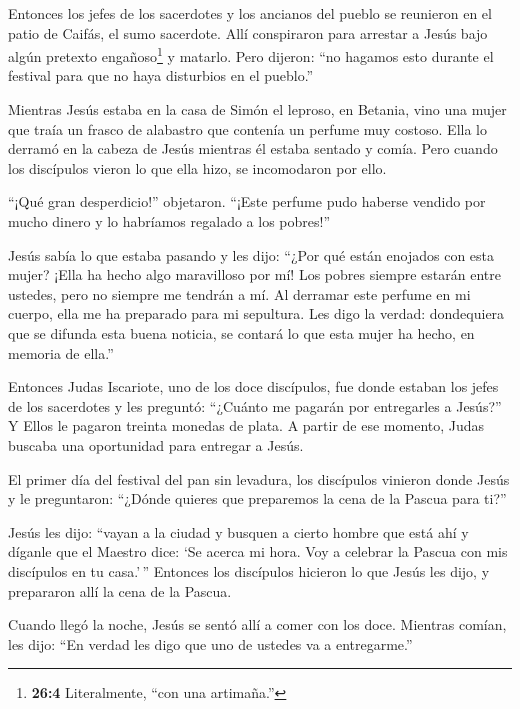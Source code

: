  Entonces los jefes de los sacerdotes y los ancianos del
pueblo se reunieron en el patio de Caifás, el sumo sacerdote.
 Allí conspiraron para arrestar a Jesús bajo algún pretexto
engañoso\footnote{\textbf{26:4} Literalmente, ``con una artimaña.''} y
matarlo.  Pero dijeron: ``no hagamos esto durante el
festival para que no haya disturbios en el pueblo.''

 Mientras Jesús estaba en la casa de Simón el leproso, en
Betania,  vino una mujer que traía un frasco de alabastro
que contenía un perfume muy costoso. Ella lo derramó en la cabeza de
Jesús mientras él estaba sentado y comía. Pero cuando los discípulos
vieron lo que ella hizo, se incomodaron por ello.

 ``¡Qué gran desperdicio!'' objetaron.  ``¡Este
perfume pudo haberse vendido por mucho dinero y lo habríamos regalado a
los pobres!''

 Jesús sabía lo que estaba pasando y les dijo: ``¿Por qué
están enojados con esta mujer? ¡Ella ha hecho algo maravilloso por mí!
 Los pobres siempre estarán entre ustedes, pero no siempre
me tendrán a mí.  Al derramar este perfume en mi cuerpo,
ella me ha preparado para mi sepultura.  Les digo la
verdad: dondequiera que se difunda esta buena noticia, se contará lo que
esta mujer ha hecho, en memoria de ella.''

 Entonces Judas Iscariote, uno de los doce discípulos, fue
donde estaban los jefes de los sacerdotes  y les preguntó:
``¿Cuánto me pagarán por entregarles a Jesús?'' Y Ellos le pagaron
treinta monedas de plata.  A partir de ese momento, Judas
buscaba una oportunidad para entregar a Jesús.

 El primer día del festival del pan sin levadura, los
discípulos vinieron donde Jesús y le preguntaron: ``¿Dónde quieres que
preparemos la cena de la Pascua para ti?''

 Jesús les dijo: ``vayan a la ciudad y busquen a cierto
hombre que está ahí y díganle que el Maestro dice: `Se acerca mi hora.
Voy a celebrar la Pascua con mis discípulos en tu casa.'\,''
 Entonces los discípulos hicieron lo que Jesús les dijo, y
prepararon allí la cena de la Pascua.

 Cuando llegó la noche, Jesús se sentó allí a comer con los
doce.  Mientras comían, les dijo: ``En verdad les digo que
uno de ustedes va a entregarme.''

